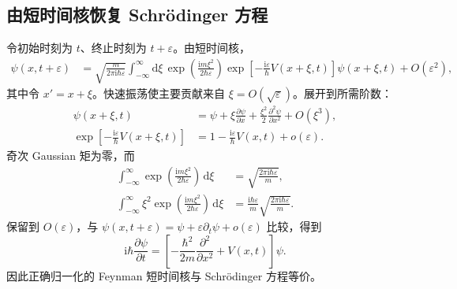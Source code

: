 \subsection{由短时间核恢复 Schr\"odinger 方程}
令初始时刻为 $t$、终止时刻为 $t+\varepsilon$。由短时间核，
\begin{align}
\psi\left(x,t+\varepsilon\right)
&=\sqrt{\frac{m}{2\pi\mathrm{i}\hbar\varepsilon}}
\int_{-\infty}^{\infty}\mathrm{d}\xi\,
\exp\left(\frac{\mathrm{i}m\xi^2}{2\hbar\varepsilon}\right)
\exp\left[-\frac{\mathrm{i}\varepsilon}{\hbar}V\left(x+\xi,t\right)\right]
\psi\left(x+\xi,t\right)+O\left(\varepsilon^2\right),
\label{eq:short-step-wavefunction}
\end{align}
其中令 $x'=x+\xi$。快速振荡使主要贡献来自 $\xi=O\left(\sqrt\varepsilon\right)$。展开到所需阶数：
\begin{align}
\psi\left(x+\xi,t\right)
&=\psi+\xi\frac{\partial\psi}{\partial x}
+\frac{\xi^2}{2}\frac{\partial^2\psi}{\partial x^2}+O\left(\xi^3\right),\\
\exp\left[-\frac{\mathrm{i}\varepsilon}{\hbar}V\left(x+\xi,t\right)\right]
&=1-\frac{\mathrm{i}\varepsilon}{\hbar}V\left(x,t\right)+o\left(\varepsilon\right).
\end{align}
奇次 Gaussian 矩为零，而
\begin{align}
\int_{-\infty}^{\infty}\exp\left(\frac{\mathrm{i}m\xi^2}{2\hbar\varepsilon}\right)\,\mathrm{d}\xi
&=\sqrt{\frac{2\pi\mathrm{i}\hbar\varepsilon}{m}},\\
\int_{-\infty}^{\infty}\xi^2
\exp\left(\frac{\mathrm{i}m\xi^2}{2\hbar\varepsilon}\right)\,\mathrm{d}\xi
&=\frac{\mathrm{i}\hbar\varepsilon}{m}
\sqrt{\frac{2\pi\mathrm{i}\hbar\varepsilon}{m}}.
\end{align}
保留到 $O\left(\varepsilon\right)$，与
$\psi\left(x,t+\varepsilon\right)=\psi+\varepsilon\partial_t\psi+o\left(\varepsilon\right)$ 比较，得到
\begin{equation}
\mathrm{i}\hbar\frac{\partial\psi}{\partial t}
=\left[-\frac{\hbar^2}{2m}\frac{\partial^2}{\partial x^2}+V\left(x,t\right)\right]\psi.
\end{equation}
因此正确归一化的 Feynman 短时间核与 Schr\"odinger 方程等价。

